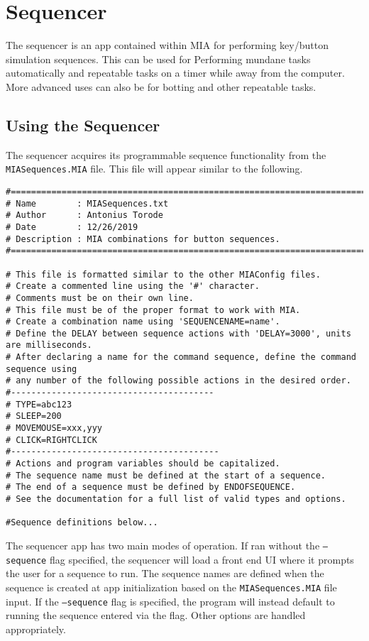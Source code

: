 \chapter{Sequencer} \label{sequencer}
\pagestyle{fancy}

The sequencer is an app contained within MIA for performing key/button simulation sequences. This can be used for Performing mundane tasks automatically and repeatable tasks on a timer while away from the computer. More advanced uses can also be for botting and other repeatable tasks.

\section{Using the Sequencer}

The sequencer acquires its programmable sequence functionality from the \texttt{MIASequences.MIA} file. This file will appear similar to the following.

\begin{lstlisting}[style=pythonstyle]
#============================================================================
# Name        : MIASequences.txt
# Author      : Antonius Torode
# Date        : 12/26/2019
# Description : MIA combinations for button sequences.
#============================================================================

# This file is formatted similar to the other MIAConfig files.
# Create a commented line using the '#' character. 
# Comments must be on their own line.
# This file must be of the proper format to work with MIA.
# Create a combination name using 'SEQUENCENAME=name'.
# Define the DELAY between sequence actions with 'DELAY=3000', units are milliseconds.
# After declaring a name for the command sequence, define the command sequence using 
# any number of the following possible actions in the desired order.
#----------------------------------------
# TYPE=abc123
# SLEEP=200
# MOVEMOUSE=xxx,yyy
# CLICK=RIGHTCLICK
#-----------------------------------------
# Actions and program variables should be capitalized.
# The sequence name must be defined at the start of a sequence.
# The end of a sequence must be defined by ENDOFSEQUENCE.
# See the documentation for a full list of valid types and options.

#Sequence definitions below...
\end{lstlisting}

The sequencer app has two main modes of operation. If ran without the \texttt{--sequence} flag specified, the sequencer will load a front end UI where it prompts the user for a sequence to run. The sequence names are defined when the sequence is created at app initialization based on the \texttt{MIASequences.MIA} file input. If the \texttt{--sequence} flag is specified, the program will instead default to running the sequence entered via the flag. Other options are handled appropriately.


